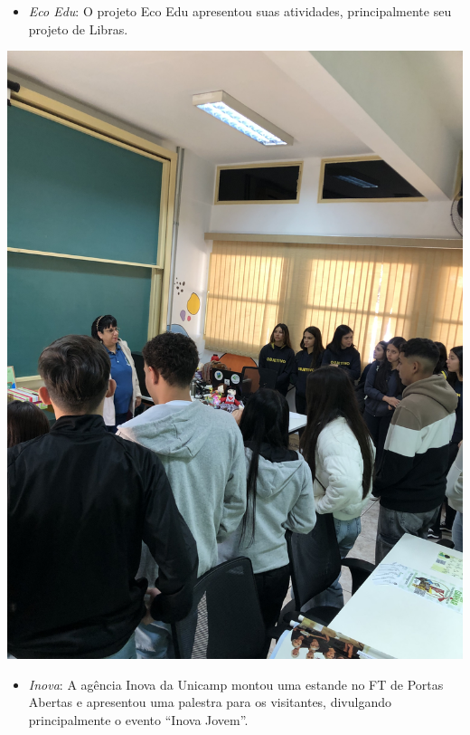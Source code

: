 \documentclass[
  letterpaper,
  DIV=11,
  numbers=noendperiod]{scrreprt}
\providecommand{\tightlist}{%
  \setlength{\itemsep}{0pt}\setlength{\parskip}{0pt}}\usepackage{longtable,booktabs,array}
\begin{document}
\begin{itemize}
\tightlist
\item
  \emph{Eco Edu}: O projeto Eco Edu apresentou suas atividades,
  principalmente seu projeto de Libras.
\end{itemize}

\includegraphics[width=0.7\linewidth,height=\textheight,keepaspectratio]{planejamento/visita-ecoedu.jpg}

\begin{itemize}
\tightlist
\item
  \emph{Inova}: A agência Inova da Unicamp montou uma estande no FT de
  Portas Abertas e apresentou uma palestra para os visitantes,
  divulgando principalmente o evento ``Inova Jovem''.
\end{itemize}
\end{document}
